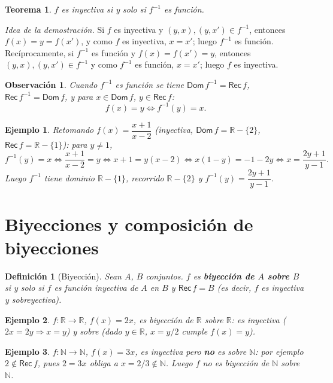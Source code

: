 \documentclass[11pt]{article}
\newtheorem{definicion}{Definición}
\newtheorem{teorema}{Teorema}
\newtheorem{ejemplo}{Ejemplo}
\newtheorem{observacion}{Observación}
\begin{document}
\begin{teorema}
$f$ es inyectiva si y solo si $f^{-1}$ es función.
\end{teorema}

\emph{Idea de la demostración.} Si $f$ es inyectiva y $(y,x),(y,x') \in f^{-1}$, entonces
$f(x)=y=f(x')$, y como $f$ es inyectiva, $x=x'$; luego $f^{-1}$ es función. Recíprocamente, si
$f^{-1}$ es función y $f(x)=f(x')=y$, entonces $(y,x),(y,x') \in f^{-1}$ y como $f^{-1}$ es función,
$x=x'$; luego $f$ es inyectiva.

\begin{observacion}
Cuando $f^{-1}$ es función se tiene $\mathsf{Dom}\,f^{-1} = \mathsf{Rec}\,f$,
$\mathsf{Rec}\,f^{-1} = \mathsf{Dom}\,f$, y para $x \in \mathsf{Dom}\,f$, $y \in \mathsf{Rec}\,f$:
$$f(x) = y \iff f^{-1}(y) = x.$$
\end{observacion}

\begin{ejemplo}
Retomando $f(x) = \dfrac{x+1}{x-2}$ (inyectiva, $\mathsf{Dom}\,f=\mathbb{R}-\{2\}$,
$\mathsf{Rec}\,f=\mathbb{R}-\{1\}$): para $y \neq 1$,
$$f^{-1}(y) = x \iff \frac{x+1}{x-2} = y \iff x+1 = y(x-2) \iff x(1-y) = -1-2y \iff x = \frac{2y+1}{y-1}.$$
Luego $f^{-1}$ tiene dominio $\mathbb{R}-\{1\}$, recorrido $\mathbb{R}-\{2\}$ y
$f^{-1}(y) = \dfrac{2y+1}{y-1}$.
\end{ejemplo}

\section{Biyecciones y composición de biyecciones}

\begin{definicion}[Biyección]
Sean $A$, $B$ conjuntos. $f$ es \textbf{biyección de $A$ sobre $B$} si y solo si $f$ es función
inyectiva de $A$ en $B$ y $\mathsf{Rec}\,f = B$ (es decir, $f$ es inyectiva y sobreyectiva).
\end{definicion}

\begin{ejemplo}
$f:\mathbb{R}\to\mathbb{R}$, $f(x)=2x$, es biyección de $\mathbb{R}$ sobre $\mathbb{R}$: es
inyectiva ($2x=2y \Rightarrow x=y$) y sobre (dado $y\in\mathbb{R}$, $x=y/2$ cumple $f(x)=y$).
\end{ejemplo}

\begin{ejemplo}
$f:\mathbb{N}\to\mathbb{N}$, $f(x)=3x$, es inyectiva pero \textbf{no} es sobre $\mathbb{N}$: por
ejemplo $2 \notin \mathsf{Rec}\,f$, pues $2=3x$ obliga a $x=2/3 \notin \mathbb{N}$. Luego $f$ no es
biyección de $\mathbb{N}$ sobre $\mathbb{N}$.
\end{ejemplo}
\end{document}
